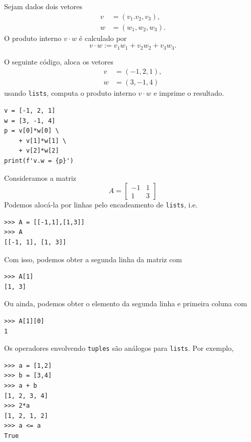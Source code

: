 \begin{ex}
  Sejam dados dois vetores
  \begin{align}
    v &= (v_1. v_2, v_3),\\
    w &= (w_1, w_2, w_3).
  \end{align}
  O produto interno $v\cdot w$ é calculado por
  \begin{equation}
    v\cdot w := v_1w_1 + v_2w_2 + v_3w_3.
  \end{equation}

  O seguinte código, aloca os vetores
  \begin{align}
    v &= (-1, 2, 1),\\
    w &= (3, -1, 4)
  \end{align}
  usando \lstinline+lists+, computa o produto interno $v\cdot w$ e imprime o resultado.

\begin{lstlisting}
v = [-1, 2, 1]
w = [3, -1, 4]
p = v[0]*w[0] \
    + v[1]*w[1] \
    + v[2]*w[2]
print(f'v.w = {p}')
\end{lstlisting}
\end{ex}

\begin{ex}
  Consideramos a matriz
  \begin{equation}
    A =
    \begin{bmatrix}
      -1 & 1 \\
      1 & 3 
    \end{bmatrix}
  \end{equation}
  Podemos alocá-la por linhas pelo encadeamento de \lstinline+lists+, i.e.
\begin{lstlisting}
>>> A = [[-1,1],[1,3]]
>>> A
[[-1, 1], [1, 3]]
\end{lstlisting}
  Com isso, podemos obter a segunda linha da matriz com
\begin{lstlisting}
>>> A[1]
[1, 3]
\end{lstlisting}
  Ou ainda, podemos obter o elemento da segunda linha  e primeira coluna com
\begin{lstlisting}
>>> A[1][0]
1
\end{lstlisting}
\end{ex}

\begin{obs}
  Os operadores envolvendo \lstinline+tuples+ são análogos para \lstinline+lists+. Por exemplo,
\begin{lstlisting}
>>> a = [1,2]
>>> b = [3,4]
>>> a + b
[1, 2, 3, 4]
>>> 2*a
[1, 2, 1, 2]
>>> a <= a
True
\end{lstlisting}
\end{obs}


